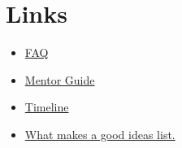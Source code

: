 \documentclass{article}
\begin{document}
\section{Links}

\begin{itemize}\item \href{https://developers.google.com/open-source/gsoc/faq}{FAQ}
\item \href{https://google.github.io/gsocguides/mentor/}{Mentor Guide}
\item \href{https://developers.google.com/open-source/gsoc/timeline}{Timeline}
\item \href{https://google.github.io/gsocguides/mentor/defining-a-project-ideas-list.html}{What makes a good ideas list.}
\end{itemize}
\end{document}
